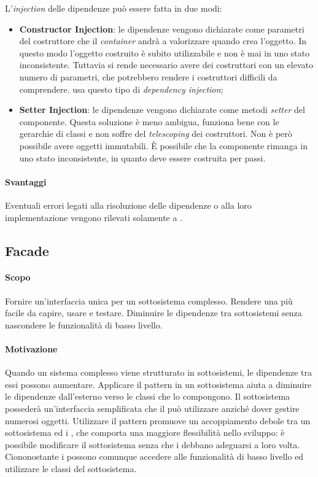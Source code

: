 L'\textit{injection} delle dipendenze può essere fatta in due modi:
\begin{itemize}
\item \textbf{Constructor Injection}: le dipendenze vengono dichiarate come parametri del costruttore che il \textit{container} andrà a valorizzare quando crea l'oggetto. In questo modo l'oggetto costruito è subito utilizzabile e non è mai in uno stato inconsistente. Tuttavia si rende necessario avere dei costruttori con un elevato numero di parametri, che potrebbero rendere i costruttori difficili da comprendere.  usa questo tipo di \textit{dependency injection};
\item \textbf{Setter Injection}: le dipendenze vengono dichiarate come metodi \textit{setter} del componente. Questa soluzione è meno ambigua, funziona bene con le gerarchie di classi e non soffre del \textit{telescoping} dei costruttori. Non è però possibile avere oggetti immutabili. \`E possibile che la componente rimanga in uno stato inconsistente, in quanto deve essere costruita per passi.
\end{itemize}
\paragraph{Svantaggi}
Eventuali errori legati alla risoluzione delle dipendenze o alla loro implementazione vengono rilevati solamente a .
\subsection{Facade}\label{Facade}
\paragraph{Scopo}
Fornire un'interfaccia unica per un sottosistema complesso. Rendere una  più facile da capire, usare e testare. Diminuire le dipendenze tra sottosistemi senza nascondere le funzionalità di basso livello.
\paragraph{Motivazione}
Quando un sistema complesso viene strutturato in sottosistemi, le dipendenze tra essi possono aumentare. Applicare il pattern  in un sottosistema aiuta a diminuire le dipendenze dall'esterno verso le classi che lo compongono. Il sottosistema possederà un'interfaccia semplificata che il  può utilizzare anziché dover gestire numerosi oggetti. Utilizzare il pattern  promuove un accoppiamento debole tra un sottosistema ed i , che comporta una maggiore flessibilità nello sviluppo: è possibile modificare il sottosistema senza che i  debbano adeguarsi a loro volta.\\
Ciononostante i  possono comunque accedere alle funzionalità di basso livello ed utilizzare le classi del sottosistema.
